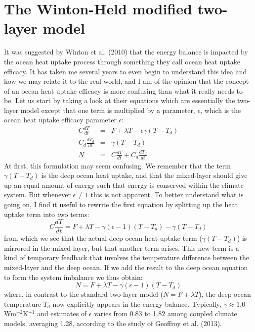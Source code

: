 \documentclass[12pt]{book}
\begin{document}
\section{The Winton-Held modified two-layer model}
It was suggested by Winton et al. (2010) that the energy balance is impacted by the ocean heat uptake process through something they call ocean heat uptake efficacy. It has taken me several years to even begin to understand this idea and how we may relate it to the real world, and I am of the opinion that the concept of an ocean heat uptake efficacy is more confusing than what it really needs to be. 
Let us start by taking a look at their equations which are essentially the two-layer model except that one term is multiplied by a parameter, $\epsilon$, which is the ocean heat uptake efficacy parameter $\epsilon$:
\begin{eqnarray}
C\frac{dT}{dt} &=& F + \lambda T- \epsilon\gamma(T-T_d) \label{eq:winton-held} \\
C_d\frac{dT_d}{dt} &=& \gamma(T-T_d) \nonumber \\
N &=& C\frac{dT}{dt}+C_d\frac{dT_d}{dt}  \nonumber
\end{eqnarray}
At first, this formulation may seem confusing. We remember that the term $\gamma(T-T_d)$ is the deep ocean heat uptake, and that the mixed-layer should give up an equal amount of energy such that energy is conserved within the climate system. But whenever $\epsilon \ne 1$ this is not apparent. To better understand what is going on, I find it useful to rewrite the first equation by splitting up the heat uptake term into two terms:
$$ C\frac{dT}{dt} = F + \lambda T- \gamma(\epsilon-1)(T-T_d) - \gamma(T-T_d)  $$
from which we see that the actual deep ocean heat uptake term ($\gamma(T-T_d)$) is mirrored in the mixed-layer, but that another term arises. This new term is a kind of temporary feedback that involves the temperature difference between the mixed-layer and the deep ocean. If we add the result to the deep ocean equation to form the system imbalance we thus obtain:
$$N =  F + \lambda T- \gamma(\epsilon-1)(T-T_d)  $$
where, in contrast to the standard two-layer model ($N =  F + \lambda T$), the deep ocean temperature $T_d$ now explicitly appears in the energy balance. Typically, $\gamma \approx 1.0$ Wm$^{-2}$K$^{-1}$ and estimates of $\epsilon$ varies from 0.83 to 1.82 among coupled climate models, averaging 1.28, according to the study of Geoffroy et al. (2013). 
\end{document}
